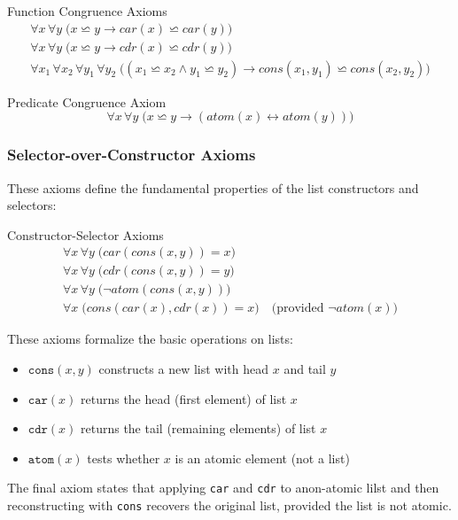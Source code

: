 \documentclass[a4paper]{article}
\newcommand{\eq}{\mathrel{\backsimeq}}
\theoremstyle{definition}
\begin{document}
\begin{axbox}{Function Congruence Axioms}
\begin{gather*}
	\forall x\, \forall y\; \bigl(x \eq y \rightarrow \mathit{car}(x) \eq \mathit{car}(y)\bigr)\\
	\forall x\, \forall y\; \bigl(x \eq y \rightarrow \mathit{cdr}(x) \eq \mathit{cdr}(y)\bigr)\\
	\forall x_1\, \forall x_2\, \forall y_1\, \forall y_2\;
	\bigl((x_1 \eq x_2 \land y_1 \eq y_2) \rightarrow
	\mathit{cons}(x_1,y_1) \eq \mathit{cons}(x_2,y_2)\bigr)
\end{gather*}
\end{axbox}

\begin{axbox}{Predicate Congruence Axiom}
\[
  \forall x\, \forall y\; \bigl(x \eq y \rightarrow (\mathit{atom}(x) \leftrightarrow \mathit{atom}(y))\bigr)
\]
\end{axbox}

\subsubsection{Selector-over-Constructor Axioms}
These axioms define the fundamental properties of the list constructors and selectors:

\begin{axbox}{Constructor-Selector Axioms}
\begin{gather*}
	\forall x\, \forall y\; \bigl(\mathit{car}(\mathit{cons}(x,y)) = x\bigr)\\
  	\forall x\, \forall y\; \bigl(\mathit{cdr}(\mathit{cons}(x,y)) = y\bigr)\\
  	\forall x\, \forall y\; \bigl(\lnot \mathit{atom}(\mathit{cons}(x,y))\bigr)\\
  	\forall x\; \bigl(\mathit{cons}(\mathit{car}(x),\mathit{cdr}(x)) = x\bigr)
  	\quad \text{(provided } \lnot \mathit{atom}(x)\text{)}
\end{gather*}
\end{axbox}
These axioms formalize the basic operations on lists:
\begin{itemize}
	\item \( \texttt{cons}(x,y) \) constructs a new list with head \( x \) and tail \( y \)     
	\item \( \texttt{car}(x) \) returns the head (first element) of list \( x \)     
	\item \( \texttt{cdr}(x) \) returns the tail (remaining elements) of list \( x \)     
	\item \( \texttt{atom}(x) \) tests whether \( x \) is an atomic element (not a list)
\end{itemize}
The final axiom states that applying \texttt{car} and \texttt{cdr} to anon-atomic lilst and then reconstructing 
with \texttt{cons} recovers the original list, provided the list is not atomic.
\end{document}
